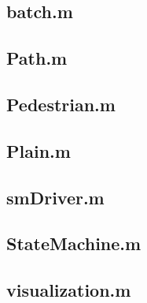 \documentclass[a4paper, DIV11, abstracton]{scrartcl}
\begin{document}
\subsection*{batch.m}

\subsection*{Path.m}

\subsection*{Pedestrian.m}

\subsection*{Plain.m}

\subsection*{smDriver.m}

\subsection*{StateMachine.m}

\subsection*{visualization.m}

\end{document}
